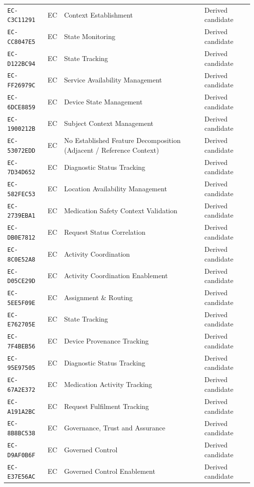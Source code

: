 \documentclass[11pt,a4paper,openany]{book}
\begin{document}
\begin{longtable}{@{}p{.19\linewidth}p{.12\linewidth}p{.39\linewidth}p{.24\linewidth}@{}}
\texttt{EC-C3C11291} & EC & Context Establishment & Derived candidate \\
\texttt{EC-CC8047E5} & EC & State Monitoring & Derived candidate \\
\texttt{EC-D122BC94} & EC & State Tracking & Derived candidate \\
\texttt{EC-FF26979C} & EC & Service Availability Management & Derived candidate \\
\texttt{EC-6DCE8859} & EC & Device State Management & Derived candidate \\
\texttt{EC-1900212B} & EC & Subject Context Management & Derived candidate \\
\texttt{EC-53072EDD} & EC & No Established Feature Decomposition (Adjacent / Reference Context) & Derived candidate \\
\texttt{EC-7D34D652} & EC & Diagnostic Status Tracking & Derived candidate \\
\texttt{EC-582FEC53} & EC & Location Availability Management & Derived candidate \\
\texttt{EC-2739EBA1} & EC & Medication Safety Context Validation & Derived candidate \\
\texttt{EC-DB0E7812} & EC & Request Status Correlation & Derived candidate \\
\texttt{EC-8C0E52A8} & EC & Activity Coordination & Derived candidate \\
\texttt{EC-D05CE29D} & EC & Activity Coordination Enablement & Derived candidate \\
\texttt{EC-5EE5F09E} & EC & Assignment \& Routing & Derived candidate \\
\texttt{EC-E762705E} & EC & State Tracking & Derived candidate \\
\texttt{EC-7F4BEB56} & EC & Device Provenance Tracking & Derived candidate \\
\texttt{EC-95E97505} & EC & Diagnostic Status Tracking & Derived candidate \\
\texttt{EC-67A2E372} & EC & Medication Activity Tracking & Derived candidate \\
\texttt{EC-A191A2BC} & EC & Request Fulfilment Tracking & Derived candidate \\
\texttt{EC-8B8BC538} & EC & Governance, Trust and Assurance & Derived candidate \\
\texttt{EC-D9AF0B6F} & EC & Governed Control & Derived candidate \\
\texttt{EC-E37E56AC} & EC & Governed Control Enablement & Derived candidate \\

\end{longtable}
\end{document}
